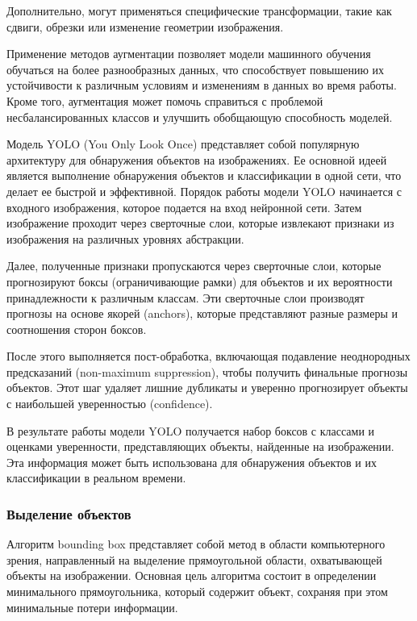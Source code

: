 Дополнительно, могут применяться специфические трансформации, такие как сдвиги, обрезки или изменение геометрии изображения.

Применение методов аугментации позволяет модели машинного обучения обучаться на более разнообразных данных, 
что способствует повышению их устойчивости к различным условиям и изменениям в данных во время работы.
Кроме того, аугментация может помочь справиться с проблемой несбалансированных классов и улучшить обобщающую способность моделей.


Модель YOLO (You Only Look Once) представляет собой популярную архитектуру для обнаружения объектов на изображениях. Ее основной идеей является выполнение обнаружения объектов и классификации в одной сети, что делает ее быстрой и эффективной.
\cite{kirillov2023segment}
Порядок работы модели YOLO начинается с входного изображения, которое подается на вход нейронной сети. Затем изображение проходит через сверточные слои, которые извлекают признаки из изображения на различных уровнях абстракции.

Далее, полученные признаки пропускаются через сверточные слои, которые прогнозируют боксы (ограничивающие рамки) для объектов и их вероятности принадлежности к различным классам. Эти сверточные слои производят прогнозы на основе якорей (anchors), которые представляют разные размеры и соотношения сторон боксов.

После этого выполняется пост-обработка, включающая подавление неоднородных предсказаний (non-maximum suppression), чтобы получить финальные прогнозы объектов. Этот шаг удаляет лишние дубликаты и уверенно прогнозирует объекты с наибольшей уверенностью (confidence).

В результате работы модели YOLO получается набор боксов с классами и оценками уверенности, представляющих объекты, найденные на изображении. Эта информация может быть использована для обнаружения объектов и их классификации в реальном времени.

\subsubsection{Выделение объектов}


Алгоритм bounding box представляет собой метод в области компьютерного зрения, направленный на выделение прямоугольной области, охватывающей объекты на изображении. Основная цель алгоритма состоит в определении минимального прямоугольника, который содержит объект, сохраняя при этом минимальные потери информации.

